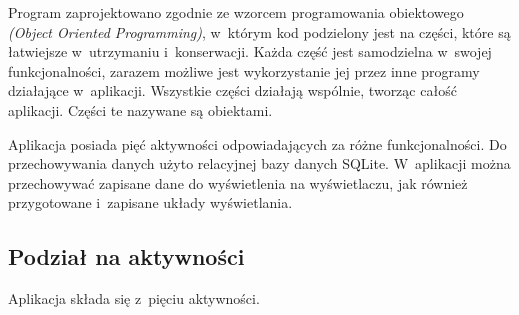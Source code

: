 \documentclass[a4paper,12pt, twoside]{article}
\begin{document}
    	Program zaprojektowano zgodnie ze wzorcem programowania obiektowego \textit{(Object Oriented Programming)}\cite{oop}, w~którym kod podzielony jest na części, które są łatwiejsze w~utrzymaniu i~konserwacji. Każda część jest samodzielna w~swojej funkcjonalności, zarazem możliwe jest wykorzystanie jej przez inne programy działające w~aplikacji. Wszystkie części działają wspólnie, tworząc całość aplikacji. Części te nazywane są obiektami. 
    	
    	Aplikacja posiada pięć aktywności odpowiadających za różne funkcjonalności. Do przechowywania danych użyto relacyjnej bazy danych SQLite. W~aplikacji można przechowywać zapisane dane do wyświetlenia na wyświetlaczu, jak również przygotowane i~zapisane układy wyświetlania.
    	\newpage
    	\subsection{Podział na aktywności}
    	\label{podzialnaaktywnosci}
    	Aplikacja składa się z~pięciu aktywności.
\end{document}
